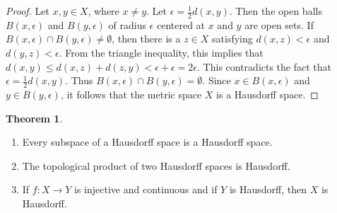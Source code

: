\documentclass[11pt,a4paper]{article}
\theoremstyle{definition}
\newtheorem{thm}{Theorem}[subsection]
\begin{document}
\begin{proof}
Let $x,y\in X$, where $x\neq y$. Let $\epsilon=\frac{1}{2}d(x,y)$. Then the open balls $B(x,\epsilon)$ and $B(y,\epsilon)$ of radius $\epsilon$ centered at $x$ and $y$ are open sets. If $B(x,\epsilon)\cap B(y,\epsilon)\neq \emptyset$, then there is a $z\in X$ satisfying $d(x,z)<\epsilon$ and $d(y,z)<\epsilon$. From the triangle inequality, this implies that $d(x,y)\leq d(x,z)+d(z,y)<\epsilon +\epsilon =2\epsilon$. This contradicts the fact that $\epsilon =\frac{1}{2}d(x,y)$. Thus $B(x,\epsilon)\cap B(y,\epsilon)=\emptyset$. Since $x\in B(x,\epsilon)$ and $y\in B(y,\epsilon)$, it follows that the metric space $X$ is a Hausdorff space.
\end{proof}






\begin{thm}
\begin{enumerate}
\item[i] Every subspace of a Hausdorff space is a Hausdorff space.
\item[ii] The topological product of two Hausdorff spaces is Hausdorff.
\item[iii] If $f:X\rightarrow Y$ is injective and continuous and if $Y$ is Hausdorff, then $X$ is Hausdorff.
\end{enumerate}
\end{thm}
\end{document}
